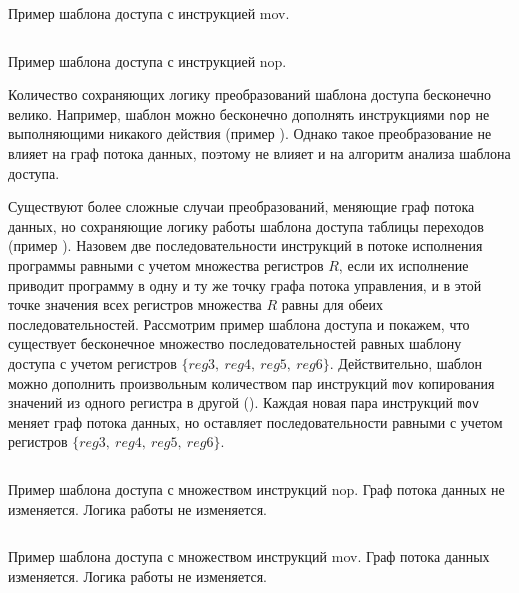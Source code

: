 \documentclass{mipt-thesis-bs}
\begin{document}
    \begin{listing}[h!]
        \inputminted[highlightlines={3}]{gas}{src/single_mov.s}
        \caption{Пример шаблона доступа с инструкцией mov.}
        \label{fig:single_mov}
    \end{listing}

    \begin{listing}[h!]
        \inputminted[highlightlines={3}]{gas}{src/single_nop.s}
        \caption{Пример шаблона доступа с инструкцией nop.}
        \label{fig:single_nop}
    \end{listing}

    Количество сохраняющих логику преобразований шаблона доступа бесконечно велико. Например, шаблон можно бесконечно дополнять инструкциями \verb|nop| не выполняющими никакого действия (пример ). Однако такое преобразование не влияет на граф потока данных, поэтому не влияет и на алгоритм анализа шаблона доступа.

    Существуют более сложные случаи преобразований, меняющие граф потока данных, но сохраняющие логику работы шаблона доступа таблицы переходов (пример ). Назовем две последовательности инструкций в потоке исполнения программы равными с учетом множества регистров $R$, если их исполнение приводит программу в одну и ту же точку графа потока управления, и в этой точке значения всех регистров множества $R$ равны для обеих последовательностей. Рассмотрим пример шаблона доступа  и покажем, что существует бесконечное множество последовательностей равных шаблону доступа с учетом регистров $\{reg3,\ reg4,\ reg5,\ reg6\}$. Действительно, шаблон можно дополнить произвольным количеством пар инструкций \verb|mov| копирования значений из одного регистра в другой (). Каждая новая пара инструкций \verb|mov| меняет граф потока данных, но оставляет последовательности равными с учетом регистров $\{reg3,\ reg4,\ reg5,\ reg6\}$.

    \begin{listing}[h!]
        \inputminted[highlightlines={3-6}]{gas}{src/nops.s}
        \caption{Пример шаблона доступа с множеством инструкций nop. Граф потока данных не изменяется. Логика работы не изменяется.}
        \label{fig:many_nops}
    \end{listing}

    \begin{listing}[h!]
        \inputminted[highlightlines={3-8}]{gas}{src/movs.s}
        \caption{Пример шаблона доступа с множеством инструкций mov. Граф потока данных изменяется. Логика работы не изменяется.}
        \label{fig:many_movs}
    \end{listing}
\end{document}
